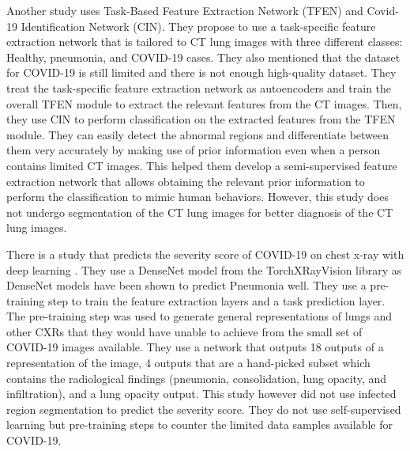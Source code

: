 Another study \cite{ref27} uses Task-Based Feature Extraction Network (TFEN) and Covid-19 Identification Network (CIN).  They propose to use a task-specific feature extraction network that is tailored to CT lung images with three different classes: Healthy, pneumonia, and COVID-19 cases. They also mentioned that the dataset for COVID-19 is still limited and there is not enough high-quality dataset. They treat the task-specific feature extraction network as autoencoders and train the overall TFEN module to extract the relevant features from the CT images. Then, they use CIN to perform classification on the extracted features from the TFEN module. They can easily detect the abnormal regions and differentiate between them very accurately by making use of prior information even when a person contains limited CT images. This helped them develop a semi-supervised feature extraction network that allows obtaining the relevant prior information to perform the classification to mimic human behaviors. However, this study does not undergo segmentation of the CT lung images for better diagnosis of the CT lung images.

There is a study that predicts the severity score of COVID-19 on chest x-ray with deep learning \cite{ref28}. They use a DenseNet model from the TorchXRayVision library as DenseNet models have been shown to predict Pneumonia well. They use a pre-training step to train the feature extraction layers and a task prediction layer. The pre-training step was used to generate general representations of lungs and other CXRs that they would have unable to achieve from the small set of COVID-19 images available. They use a network that outputs 18 outputs of a representation of the image, 4 outputs that are a hand-picked subset which contains the radiological findings (pneumonia, consolidation, lung opacity, and infiltration), and a lung opacity output. This study however did not use infected region segmentation to predict the severity score. They do not use self-supervised learning but pre-training steps to counter the limited data samples available for COVID-19.

